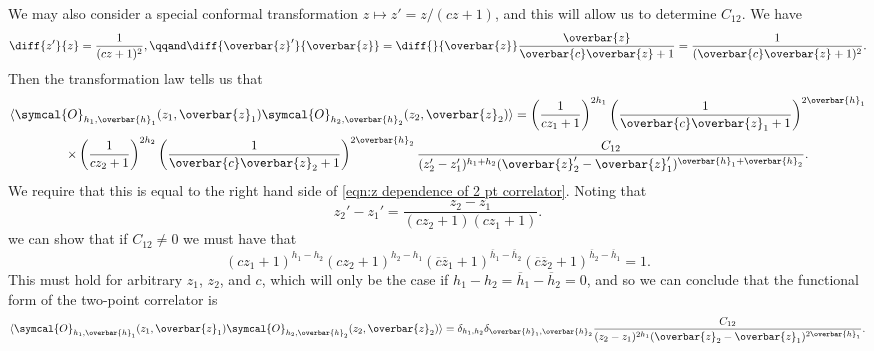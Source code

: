 \documentclass[fleqn]{NotesClass}
\newcommand{\quantumField}[1]{\symcal{#1}}
\DeclarePairedDelimiter{\correlator}{\langle}{\rangle}
\begin{document}
    We may also consider a special conformal transformation \(z \mapsto z' = z/(cz + 1)\), and this will allow us to determine \(C_{12}\).
    We have
    \begin{equation}
        \diff{z'}{z} = \frac{1}{(cz + 1)^2}, \qqand \diff{\overbar{z}'}{\overbar{z}} = \diff{}{\overbar{z}} \frac{\overbar{z}}{\overbar{c}\overbar{z} + 1} = \frac{1}{(\overbar{c}\overbar{z} + 1)^2}.
    \end{equation}
    Then the transformation law tells us that
    \begin{multline}
        \correlator{\quantumField{O}_{h_1,\overbar{h}_1}(z_1, \overbar{z}_1) \quantumField{O}_{h_2,\overbar{h}_2}(z_2, \overbar{z}_2)} = \left( \frac{1}{cz_1 + 1} \right)^{2h_1} \left( \frac{1}{\overbar{c}\overbar{z}_1 + 1} \right)^{2\overbar{h}_1}\\
        \times \left( \frac{1}{cz_2 + 1} \right)^{2h_2} \left( \frac{1}{\overbar{c}\overbar{z}_2 + 1} \right)^{2\overbar{h}_2} \frac{C_{12}}{(z_2' - z_1')^{h_1 + h_2} (\overbar{z}_2' - \overbar{z}_1')^{\overbar{h}_1 + \overbar{h}_2}}.
    \end{multline}
    We require that this is equal to the right hand side of \cref{eqn:z dependence of 2 pt correlator}.
    Noting that
    \begin{equation}
        z_2' - z_1' = \frac{z_2 - z_1}{(cz_2 + 1)(cz_1 + 1)}.
    \end{equation}
    we can show that if \(C_{12} \ne 0\) we must have that
    \begin{equation}
        (cz_1 + 1)^{h_1 - h_2} (cz_2 + 1)^{h_2 - h_1} (\overbar{c}\overbar{z}_1 + 1)^{\overbar{h}_1 - \overbar{h}_2} (\overbar{c}\overbar{z}_2 + 1)^{\overbar{h}_2 - \overbar{h}_1} = 1.
    \end{equation}
    This must hold for arbitrary \(z_1\), \(z_2\), and \(c\), which will only be the case if \(h_1 - h_2 = \overbar{h}_1 - \overbar{h}_2 = 0\), and so we can conclude that the functional form of the two-point correlator is
    \begin{equation}
        \label{eqn:general 2 pt correlator}
        \correlator{\quantumField{O}_{h_1,\overbar{h}_1}(z_1, \overbar{z}_1) \quantumField{O}_{h_2, \overbar{h}_2}(z_2, \overbar{z}_2)} = \delta_{h_1,h_2} \delta_{\overbar{h}_1, \overbar{h}_2} \frac{C_{12}}{(z_2 - z_1)^{2h_1} (\overbar{z}_2 - \overbar{z}_1)^{2\overbar{h}_1}}.
    \end{equation}
    
\end{document}
